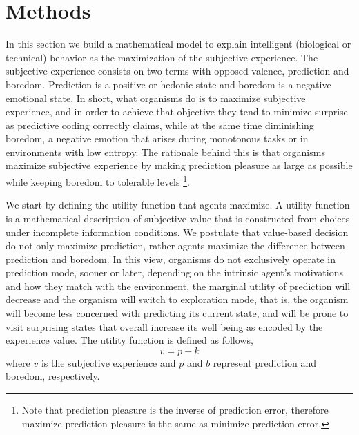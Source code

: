 \documentclass[11pt, onecolumn]{article}
\begin{document}
\section{Methods}
\label{se:methods}

In this section we build a mathematical model to explain intelligent (biological or technical) behavior as the maximization of the subjective experience. 
The subjective experience consists on two terms with opposed valence, prediction and boredom. Prediction is a positive or hedonic state and boredom is a negative emotional state. In short, what organisms do is to maximize subjective experience, and in order to achieve that objective they tend to minimize surprise as predictive coding correctly claims, while at the same time diminishing boredom, a negative emotion that arises during monotonous tasks or in environments with low entropy. The rationale behind this is that organisms maximize subjective experience by making prediction pleasure as large as possible while keeping boredom to tolerable levels \footnote{Note that prediction pleasure is the inverse of prediction error, therefore maximize prediction pleasure is the same as minimize prediction error.}.


We start by defining the utility function that agents maximize. 
A utility function is a mathematical description of subjective value that is constructed from choices under incomplete information conditions. We postulate that value-based decision do not only maximize prediction, rather agents maximize the difference between prediction and boredom. In this view, organisms do not exclusively operate in prediction mode, sooner or later, depending on the intrinsic agent's motivations and how they match with the environment, the marginal utility of prediction will decrease and the organism will switch to exploration mode, that is, the organism will become less concerned with predicting its current state, and  will be prone to visit surprising states that overall increase its well being as encoded by the experience value. 
The utility function is defined as follows,
\begin{equation}
    v =  p - k
\label{eq:vpb}
\end{equation}
where $v$ is the subjective experience and $p$ and $b$ represent prediction and boredom, respectively. 
\end{document}
